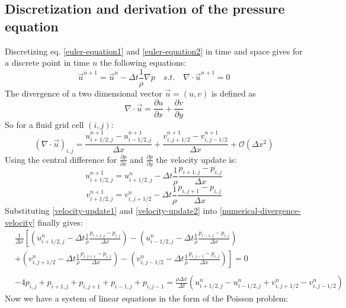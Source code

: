 \subsection{Discretization and derivation of the pressure equation}
Discretizing eq. \ref{euler-equation1} and \ref{euler-equation2} in time and space gives for a discrete point in time $n$ the following equations:
\begin{equation} \label{navier-stokes-pressure-numerical1}
    \vec{u}^{n+1} = \vec{u}^{n} - \Delta t \frac{1}{\rho} \nabla p \quad s.t. \quad \nabla \cdot \vec{u}^{n+1} = 0
\end{equation}
The divergence of a two dimensional vector $\vec{u} = (u, v)$ is defined as
\begin{equation} \label{general-divergence}
    \nabla \cdot \vec{u} = \frac{\partial u}{\partial x} + \frac{\partial v}{\partial y}
\end{equation}
So for a fluid grid cell $(i, j)$:
\begin{equation} \label{numerical-divergence-velocity}
    (\nabla \cdot \vec{u})_{i,j} = \frac{u_{i+1/2,j}^{n+1} - u_{i-1/2,j}^{n+1}}{\Delta x} + \frac{v_{i,j+1/2}^{n+1} - v_{i,j-1/2}^{n+1}}{\Delta x} + \mathcal{O}(\Delta x^2)
\end{equation}
Using the central difference for $\frac{\partial p}{\partial x}$ and $\frac{\partial p}{\partial y}$ the velocity update is:
\begin{equation} \label{velocity-update1}
    u_{i+1/2,j}^{n+1} = u_{i+1/2,j}^{n} - \Delta t \frac{1}{\rho} \frac{p_{i+1,j} - p_{i,j}}{\Delta x}
\end{equation}
\begin{equation} \label{velocity-update2}
v_{i+1/2,j}^{n+1} = v_{i,j+1/2}^{n} - \Delta t \frac{1}{\rho} \frac{p_{i,j+1} - p_{i,j}}{\Delta x}
\end{equation}
Substituting \ref{velocity-update1} and \ref{velocity-update2} into \ref{numerical-divergence-velocity} finally gives:
\begin{equation} \label{pressure-equation}
    \begin{aligned}
        & \frac{1}{\Delta x}\left[\left(u_{i+1/2,j}^{n} - \Delta t \frac{1}{\rho} \frac{p_{i+1,j} - p_{i,j}}{\Delta x}\right) - \left(u_{i-1/2,j}^{n} - \Delta t \frac{1}{\rho} \frac{p_{i-1,j} - p_{i,j}}{\Delta x}\right) \right. \\
        & + \left. \left(v_{i,j+1/2}^{n} - \Delta t \frac{1}{\rho} \frac{p_{i,j+1} - p_{i,j}}{\Delta x}\right) - \left(v_{i,j-1/2}^{n} - \Delta t \frac{1}{\rho} \frac{p_{i,j-1} - p_{i,j}}{\Delta x} \right) \right] = 0 \\\\
        &  - 4p_{i,j} + p_{i+1,j} + p_{i,j+1} + p_{i-1,j} + p_{i,j-1} = \frac{\rho \Delta x}{\Delta t} \left(u_{i+1/2,j}^{n} - u_{i-1/2,j}^{n} + v_{i,j+1/2}^{n} - v_{i,j-1/2}^{n}\right)
\end{aligned}
\end{equation}
Now we have a system of linear equations in the form of the Poisson problem:

